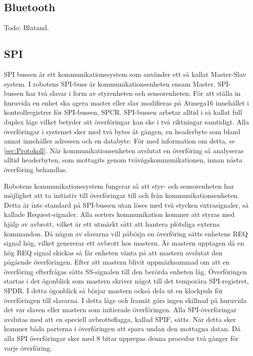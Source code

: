 \subsection{Bluetooth}
Todo: Blatand.

\subsection{SPI}
\label{sec:SPI}
SPI bussen är ett kommunikationssystem som använder ett så kallat Master-Slav system. I robotens SPI-buss är kommunikationsenheten ensam Master. SPI-bussen har två slavar i form av styrenheten och sensorenheten. För att ställa in huruvida en enhet ska agera master eller slav modifieras på Atmega16 innehållet i kontrollregistrer för SPI-bussen, SPCR. SPI-bussen arbetar alltid i så kallat full duplex läge vilket betyder att överföringar kan ske i två riktningar samtidigt. Alla överföringar i systemet sker med två bytes åt gången, en headerbyte som bland annat innehåller adressen och en databyte. För med information om detta, se \ref{sec:Protokoll}. När kommunikationsenheten avslutat en överföring så analyseras alltid headerbyten, som mottagits genom tvåvägskommunikationen, innan nästa överföring behandlas.

Robotens kommunikationssystem fungerar så att styr- och sensorenheten har möjlighet att ta initiativ till överföringar till och från kommunikationsenheten. Detta är inte standard på SPI-bussen utan löses med två stycken extrasignaler, så kallade Request-signaler. Alla sorters kommunikation kommer att styras med hjälp av avbrott, vilket är ett utmärkt sätt att hantera plötsliga externa kommandon. Då någon av slavarna vill påbörja en överföring sätts enhetens REQ signal hög, vilket genererar ett avbrott hos mastern. Är mastern upptagen då en hög REQ signal skickas så får enheten vänta på att mastern avslutat den pågående överföringen. Efter att mastern blivit uppmärksammad om att en överföring efterfrågas sätts SS-signalen till den berörda enheten låg. Överföringen startas i det ögonblick som mastern skriver något till det temporära SPI-registret, SPDR. I detta ögonblick så börjar mastern också dela ut en klockpuls för överföringen till slavarna. I detta läge och framåt görs ingen skillnad på huruvida det var slaven eller mastern som initierade överföringen. Alla SPI-överföringar avslutas med att en speciell avbrottsflagga, kallad SPIF, sätts. När detta sker kommer båda parterna i överföringen att spara undan den mottagna datan. Då alla SPI överföringar sker med 8 bitar upprepas denna procedur två gånger för varje överföring.

